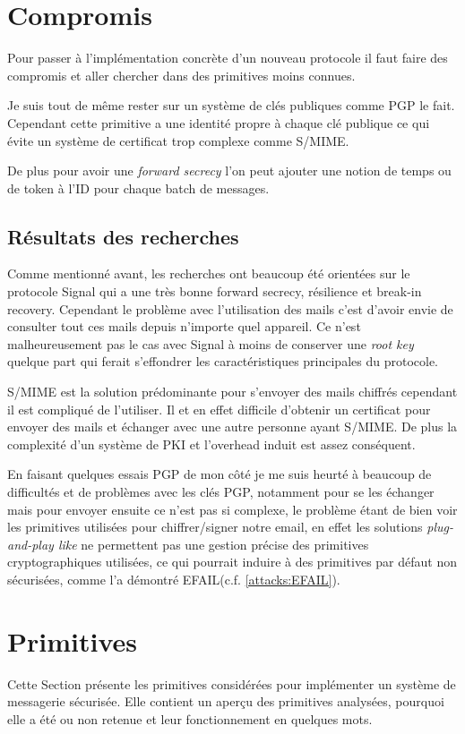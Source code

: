 \section{Compromis}
Pour passer à l'implémentation concrète d'un nouveau protocole il faut faire des compromis et aller chercher dans des primitives moins connues.

Je suis tout de même rester sur un système de clés publiques comme PGP le fait. Cependant cette primitive a une identité propre à chaque clé publique ce qui évite un système de certificat trop complexe comme S/MIME.

De plus pour avoir une \textit{forward secrecy} l'on peut ajouter une notion de temps ou de token à l'ID pour chaque batch de messages.
\subsection{Résultats des recherches}
Comme mentionné avant, les recherches ont beaucoup été orientées sur le protocole Signal qui a une très bonne forward secrecy, résilience et break-in recovery. Cependant le problème avec l'utilisation des mails c'est d'avoir envie de consulter tout ces mails depuis n'importe quel appareil. Ce n'est malheureusement pas le cas avec Signal à moins de conserver une \textit{root key} quelque part qui ferait s'effondrer les caractéristiques principales du protocole.

S/MIME est la solution prédominante pour s'envoyer des mails chiffrés cependant il est compliqué de l'utiliser. Il et en effet difficile d'obtenir un certificat pour envoyer des mails et échanger avec une autre personne ayant S/MIME. De plus la complexité d'un système de PKI et l'overhead induit est assez conséquent.

En faisant quelques essais PGP de mon côté je me suis heurté à beaucoup de difficultés et de problèmes avec les clés PGP, notamment pour se les échanger mais pour envoyer ensuite ce n'est pas si complexe, le problème étant de bien voir les primitives utilisées pour chiffrer/signer notre email, en effet les solutions \textit{plug-and-play like} ne permettent pas une gestion précise des primitives cryptographiques utilisées, ce qui pourrait induire à des primitives par défaut non sécurisées, comme l'a démontré EFAIL(c.f. \ref{attacks:EFAIL}).



\section{Primitives}
Cette Section présente les primitives considérées pour implémenter un système de messagerie sécurisée. Elle contient un aperçu des primitives analysées, pourquoi elle a été ou non retenue et leur fonctionnement en quelques mots.
